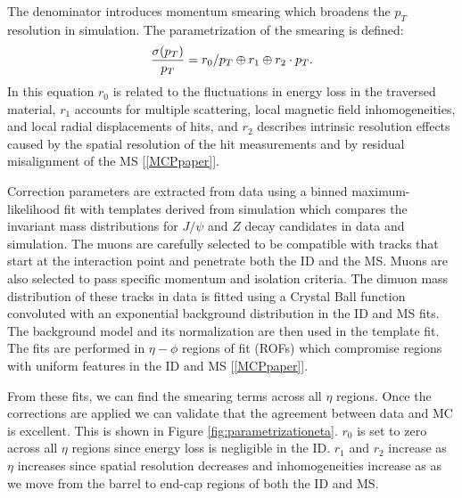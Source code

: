\par \hspace{20pt} The denominator introduces momentum smearing which broadens the $p_T$ resolution in simulation. The parametrization of the smearing is defined:
\begin{align*}
	\centering 
    \frac{\sigma(p_T)}{p_T} = r_0/p_T \oplus r_1 \oplus r_2 \cdot p_T .
\end{align*}
In this equation $r_0$ is related to the fluctuations in energy loss in the traversed material, $r_1$ accounts for multiple scattering, local magnetic field inhomogeneities, and local radial displacements of hits, and $r_2$ describes intrinsic resolution effects caused by the spatial resolution of the hit measurements and by residual misalignment of the MS [\ref{MCPpaper}]. 

\par \hspace{20pt} Correction parameters are extracted from data using a binned maximum-likelihood fit with templates derived from simulation which compares the invariant mass distributions for $J/\psi$ and $Z$ decay candidates in data and simulation. The muons are carefully selected to be compatible with tracks that start at the interaction point and penetrate both the ID and the MS. Muons are also selected to pass specific momentum and isolation criteria. The dimuon mass distribution of these tracks in data is fitted using a Crystal Ball function convoluted with an exponential background distribution in the ID and MS fits. The background model and its normalization are then used in the template fit. The fits are performed in $\eta-\phi$ regions of fit (ROFs) which compromise regions with uniform features in the ID and MS [\ref{MCPpaper}]. 

\par \hspace{20pt} From these fits, we can find the smearing terms across all $\eta$ regions. Once the corrections are applied we can validate that the agreement between data and MC is excellent. This is shown in Figure \ref{fig:parametrizationeta}. $r_0$ is set to zero across all $\eta$ regions since energy loss is negligible in the ID. $r_1$ and $r_2$ increase as $\eta$ increases since spatial resolution decreases and inhomogeneities increase as as we move from the barrel to end-cap regions of both the ID and MS. 

